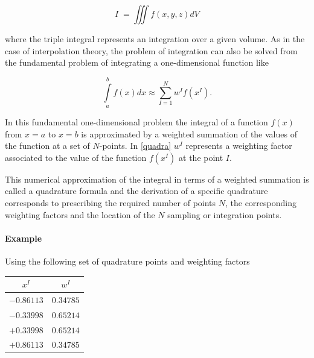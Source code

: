 \begin{equation}
I\;=\iiint f(x,y,z)dV
\label{sample integral 2}
\end{equation}

where the triple integral represents an integration over a given volume. As in the case of interpolation theory, the problem of integration can also be solved from the fundamental problem of integrating a one-dimensional function like

\begin{equation}
\int\limits_a^b {f(x)dx}  \approx \sum\limits_{I = 1}^N {{w^I}} f({x^I}).
\label{quadra}
\end{equation}





In this fundamental one-dimensional problem the integral of a function $f(x)$ from $x = a$ to $x= b$ is approximated by a weighted summation of the values of the function at a set of $N$-points. In \eqref{quadra} $w^I$ represents a weighting factor associated to the value of the function $f({x^I})$ at the point $I$. 



This numerical approximation of the integral in terms of a weighted summation is called a quadrature formula and the derivation of a specific quadrature corresponds to prescribing the required number of points $N$, the corresponding weighting factors and the location of the $N$ sampling or integration points.

\paragraph*{Example}
Using the following set of quadrature points and weighting factors

\begin{center}
\begin{tabular}{cc}
  \hline
  $x^I$ & $w^I$ \\
  \hline
  $-0.86113$  & $0.34785$  \\
  $-0.33998$  & $0.65214$  \\
  $ +0.33998$  & $0.65214$  \\
  $ +0.86113$  & $0.34785$  \\
  \hline
\end{tabular}
\label{ejemplo}
\end{center}

